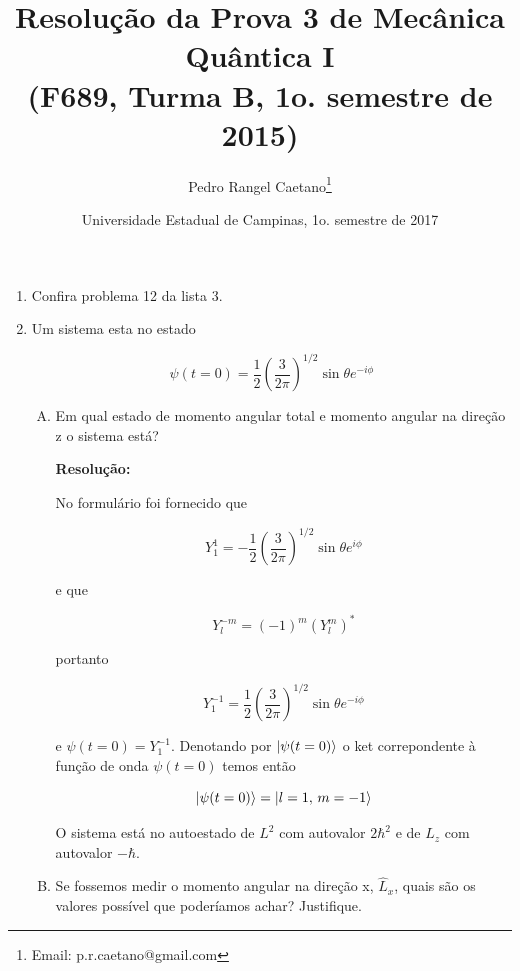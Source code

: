 \documentclass[a4paper, 12pt, notitlepage]{article}
\begin{document}
\title{Resolução da Prova 3 de Mecânica Quântica I\\ (F689, Turma B, 1o. semestre de 2015)}
\author{Pedro Rangel Caetano\footnote{Email: p.r.caetano@gmail.com}} 
\date{Universidade Estadual de Campinas, 1o. semestre de 2017}
\maketitle


\begin{enumerate}

\item Confira problema 12 da lista 3.

\item Um sistema esta no estado

\[
  \psi(t = 0) = \frac{1}{2} \left(\frac{3}{2\pi}\right)^{1/2} \sin \theta e^{-i\phi}  
\]

\begin{enumerate}[(A)]
  \item Em qual estado de momento angular total e momento angular na direção z o sistema está?
  
  \textbf{Resolução: }
  
  No formulário foi fornecido que
  
  \[
  Y^1_1 = -\frac{1}{2}\left(\frac{3}{2\pi}\right)^{1/2}\sin \theta e^{i\phi}
  \]
  
  \noindent e que
  
  \[
  Y_l^{-m} = (-1)^m(Y^m_l)^{\ast}
  \]
  
  \noindent portanto  
  
  \[
  Y^{-1}_1 = \frac{1}{2}\left(\frac{3}{2\pi}\right)^{1/2}\sin \theta e^{-i\phi}
  \]
  
  \noindent e $\psi(t = 0) = Y^{-1}_1$. Denotando por $\ket{\psi(t=0)}$ o ket correpondente à função de onda $\psi(t=0)$ temos então
  
  \[
  \ket{\psi(t=0)} = \ket{l=1,\,m=-1}
  \]
  
  O sistema está no autoestado de $L^2$ com autovalor $2\hbar^2$ e de $L_z$ com autovalor $-\hbar$.
  
  \item Se fossemos medir o momento angular na direção x, $\hat{L}_x$, quais são os valores possível que poderíamos achar? Justifique.
  

\end{enumerate}
\end{enumerate}
\end{document}
